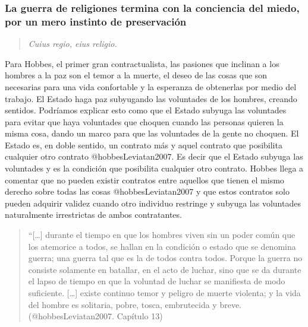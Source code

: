 \documentclass[
]{article}
\begin{document}
\hypertarget{la-guerra-de-religiones-termina-con-la-conciencia-del-miedo-por-un-mero-instinto-de-preservaciuxf3n}{%
\subsubsection{La guerra de religiones termina con la conciencia del
miedo, por un mero instinto de
preservación}\label{la-guerra-de-religiones-termina-con-la-conciencia-del-miedo-por-un-mero-instinto-de-preservaciuxf3n}}

\begin{quote}
\emph{Cuius regio, eius religio.}
\end{quote}

Para Hobbes, el primer gran contractualista, las pasiones que inclinan a
los hombres a la paz son el temor a la muerte, el deseo de las cosas que
son necesarias para una vida confortable y la esperanza de obtenerlas
por medio del trabajo. El Estado haga paz subyugando las voluntades de
los hombres, creando sentidos. Podríamos explicar esto como que el
Estado subyuga las voluntades para evitar que haya voluntades que
choquen cuando las personas quieren la misma cosa, dando un marco para
que las voluntades de la gente no choquen. El Estado es, en doble
sentido, un contrato más y aquel contrato que posibilita cualquier otro
contrato @hobbesLeviatan2007. Es decir que el Estado subyuga las
voluntades y es la condición que posibilita cualquier otro contrato.
Hobbes llega a comentar que no pueden existir contratos entre aquellos
que tienen el mismo derecho sobre todas las cosas @hobbesLeviatan2007 y
que estos contratos solo pueden adquirir validez cuando otro individuo
restringe y subyuga las voluntades naturalmente irrestrictas de ambos
contratantes.

\begin{quote}
``{[}\ldots{]} durante el tiempo en que los hombres viven sin un poder
común que los atemorice a todos, se hallan en la condición o estado que
se denomina guerra; una guerra tal que es la de todos contra todos.
Porque la guerra no consiste solamente en batallar, en el acto de
luchar, sino que se da durante el lapso de tiempo en que la voluntad de
luchar se manifiesta de modo suficiente. {[}\ldots{]} existe continuo
temor y peligro de muerte violenta; y la vida del hombre es solitaria,
pobre, tosca, embrutecida y breve. (@hobbesLeviatan2007. Capítulo 13)
\end{quote}
\end{document}
